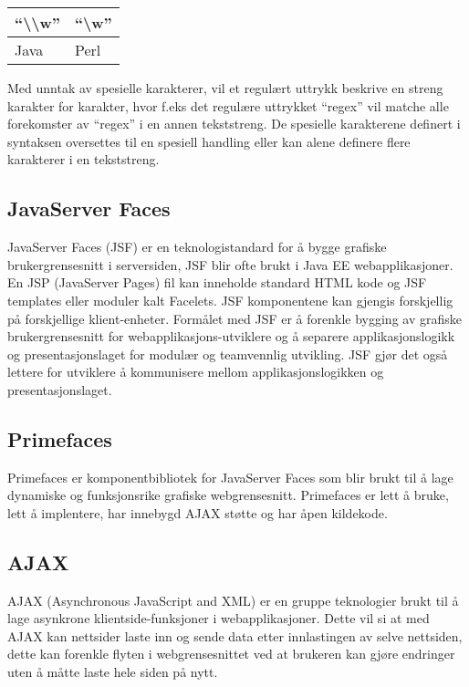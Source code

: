 \documentclass[../main.tex]{subfiles}
\begin{document}
\begin{center}
  \begin{tabular}{ | p{5cm} | p{5cm} |}
    \hline
    “\textbackslash \textbackslash w” & “\textbackslash w” \\ \hline
    Java & Perl \\
    \hline
  \end{tabular}
\end{center}

Med unntak av spesielle karakterer, vil et regulært uttrykk beskrive en streng karakter for karakter, hvor f.eks det regulære uttrykket “regex” vil matche alle forekomster av “regex” i en annen tekststreng. De spesielle karakterene definert i syntaksen oversettes til en spesiell handling eller kan alene definere flere karakterer i en tekststreng. 

\subsection{JavaServer Faces}
JavaServer Faces (JSF) er en teknologistandard for å bygge grafiske brukergrensesnitt i serversiden, JSF blir ofte brukt i Java EE webapplikasjoner. En JSP (JavaServer Pages) fil kan inneholde standard HTML kode og JSF templates eller moduler kalt Facelets. JSF komponentene kan gjengis forskjellig på forskjellige klient-enheter. Formålet med JSF er å forenkle bygging av grafiske brukergrensesnitt for webapplikasjons-utviklere og å separere applikasjonslogikk og presentasjonslaget for modulær og teamvennlig utvikling. JSF gjør det også lettere for utviklere å kommunisere mellom applikasjonslogikken og presentasjonslaget. 

\subsection{Primefaces}
Primefaces er komponentbibliotek for JavaServer Faces som blir brukt til å lage dynamiske og funksjonsrike grafiske webgrensesnitt. Primefaces er lett å bruke, lett å implentere, har innebygd AJAX støtte og har åpen kildekode.

\subsection{AJAX}
AJAX (Asynchronous JavaScript and XML) er en gruppe teknologier brukt til å lage asynkrone klientside-funksjoner i webapplikasjoner. Dette vil si at med AJAX kan nettsider laste inn og sende data etter innlastingen av selve nettsiden, dette kan forenkle flyten i webgrensesnittet ved at brukeren kan gjøre endringer uten å måtte laste hele siden på nytt. 
\end{document}
